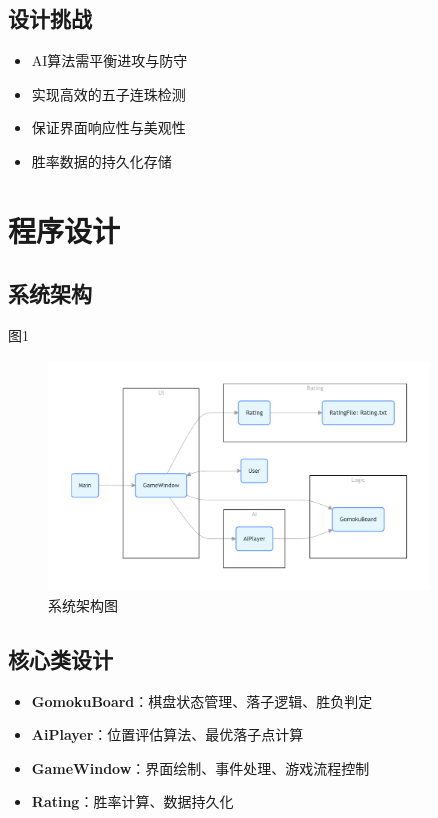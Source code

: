 \documentclass[UTF8]{ctexart}
\begin{document}
\subsection{设计挑战}
\begin{itemize}
    \item AI算法需平衡进攻与防守
    \item 实现高效的五子连珠检测
    \item 保证界面响应性与美观性
    \item 胜率数据的持久化存储
\end{itemize}

\section{程序设计}
\subsection{系统架构}
图1
\begin{figure}[h]
    \centering
    \includegraphics[width=0.9\textwidth]{structure.png}
    \caption{系统架构图}
\end{figure}

\subsection{核心类设计}
\begin{itemize}
    \item \textbf{GomokuBoard}：棋盘状态管理、落子逻辑、胜负判定
    \item \textbf{AiPlayer}：位置评估算法、最优落子点计算
    \item \textbf{GameWindow}：界面绘制、事件处理、游戏流程控制
    \item \textbf{Rating}：胜率计算、数据持久化
\end{itemize}
\end{document}
